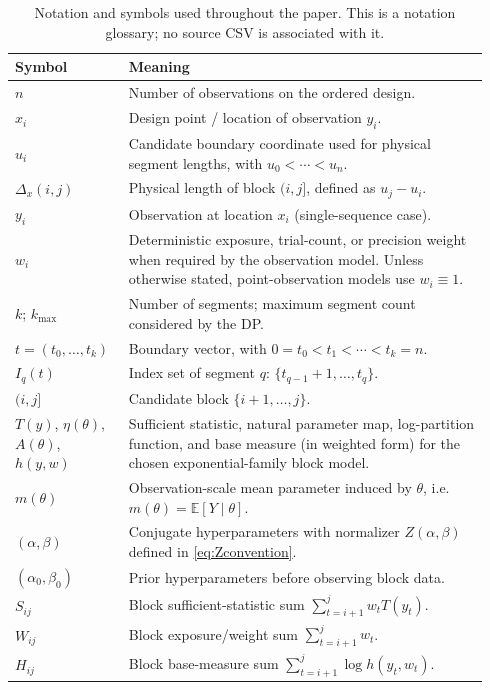 \begin{longtable}{@{}p{0.22\linewidth}p{0.72\linewidth}@{}}
\caption[Notation and symbols]{Notation and symbols used throughout the paper. This is a notation glossary; no source CSV is associated with it.}\label{tab:notation}\\
\toprule
\textbf{Symbol} & \textbf{Meaning} \\
\midrule
$n$ & Number of observations on the ordered design. \\
$x_i$ & Design point / location of observation $y_i$. \\
$u_i$ & Candidate boundary coordinate used for physical segment lengths, with $u_0<\cdots<u_n$. \\
$\Delta_x(i,j)$ & Physical length of block $(i,j]$, defined as $u_j-u_i$. \\
$y_i$ & Observation at location $x_i$ (single-sequence case). \\
$w_i$ & Deterministic exposure, trial-count, or precision weight when required by the observation model. Unless otherwise stated, point-observation models use $w_i\equiv 1$. \\
\midrule
$k$; $k_{\max}$ & Number of segments; maximum segment count considered by the DP. \\
$t=(t_0,\dots,t_k)$ & Boundary vector, with $0=t_0<t_1<\cdots<t_k=n$. \\
$I_q(t)$ & Index set of segment $q$: $\{t_{q-1}+1,\dots,t_q\}$. \\
$(i,j]$ & Candidate block $\{i+1,\dots,j\}$. \\
\midrule
$T(y)$, $\eta(\theta)$, $A(\theta)$, $h(y,w)$ & Sufficient statistic, natural parameter map, log-partition function, and base measure (in weighted form) for the chosen exponential-family block model. \\
$m(\theta)$ & Observation-scale mean parameter induced by $\theta$, i.e. $m(\theta)=\mathbb{E}[Y\mid\theta]$. \\
\midrule
$(\alpha,\beta)$ & Conjugate hyperparameters with normalizer $Z(\alpha,\beta)$ defined in \eqref{eq:Zconvention}. \\
$(\alpha_0,\beta_0)$ & Prior hyperparameters before observing block data. \\
\midrule
$S_{ij}$ & Block sufficient-statistic sum $\sum_{t=i+1}^j w_t T(y_t)$. \\
$W_{ij}$ & Block exposure/weight sum $\sum_{t=i+1}^j w_t$. \\
$H_{ij}$ & Block base-measure sum $\sum_{t=i+1}^j \log h(y_t,w_t)$. \\

\end{longtable}
